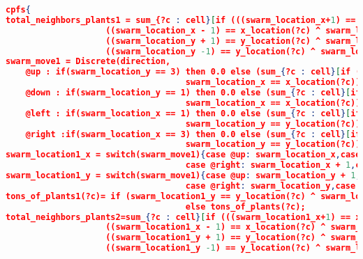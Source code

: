 \begin{lstlisting}[floatplacement=h,numbersymbol=$:$,language=json,caption={The Locusts Swarm domain in RDDL code.},label={lst:LocustsDomain_RDDL},basicstyle=\tiny]
cpfs{
total_neighbors_plants1 = sum_{?c : cell}[if (((swarm_location_x+1) == x_location(?c) ^ swarm_location_y == y_location(?c)) |
                    ((swarm_location_x - 1) == x_location(?c) ^ swarm_location_y == y_location(?c)) | 
                    ((swarm_location_y + 1) == y_location(?c) ^ swarm_location_x == x_location(?c)) |
                    ((swarm_location_y -1) == y_location(?c) ^ swarm_location_x == x_location(?c))) then tons_of_plants(?c) else 0.0];
swarm_move1 = Discrete(direction, 
    @up : if(swarm_location_y == 3) then 0.0 else (sum_{?c : cell}[if ((swarm_location_y + 1) == y_location(?c) ^ 
                                    swarm_location_x == x_location(?c)) then tons_of_plants(?c) else 0.0])/total_neighbors_plants1,
    @down : if(swarm_location_y == 1) then 0.0 else (sum_{?c : cell}[if ((swarm_location_y - 1) == y_location(?c) ^ 
                                    swarm_location_x == x_location(?c)) then tons_of_plants(?c) else 0.0]/total_neighbors_plants1),
    @left : if(swarm_location_x == 1) then 0.0 else (sum_{?c : cell}[if ((swarm_location_x - 1) == x_location(?c) ^ 
                                    swarm_location_y == y_location(?c)) then tons_of_plants(?c) else 0.0]/total_neighbors_plants1),
    @right :if(swarm_location_x == 3) then 0.0 else (sum_{?c : cell}[if ((swarm_location_x + 1) == x_location(?c) ^ 
                                    swarm_location_y == y_location(?c)) then tons_of_plants(?c) else 0.0]/total_neighbors_plants1));
swarm_location1_x = switch(swarm_move1){case @up: swarm_location_x,case @down: swarm_location_x,
                                    case @right: swarm_location_x + 1,case @left: swarm_location_x - 1}; 
swarm_location1_y = switch(swarm_move1){case @up: swarm_location_y + 1, case @down: swarm_location_y - 1,
                                    case @right: swarm_location_y,case @left: swarm_location_y};
tons_of_plants1(?c)= if (swarm_location1_y == y_location(?c) ^ swarm_location1_x == x_location(?c)) then tons_of_plants(?c)*0.5 
                                    else tons_of_plants(?c);
total_neighbors_plants2=sum_{?c : cell}[if (((swarm_location1_x+1) == x_location(?c) ^ swarm_location1_y == y_location(?c)) |
                    ((swarm_location1_x - 1) == x_location(?c) ^ swarm_location1_y == y_location(?c)) | 
                    ((swarm_location1_y + 1) == y_location(?c) ^ swarm_location1_x == x_location(?c)) |
                    ((swarm_location1_y -1) == y_location(?c) ^ swarm_location1_x == x_location(?c))) then tons_of_plants1(?c) else 0.0];
                    

\end{lstlisting}
